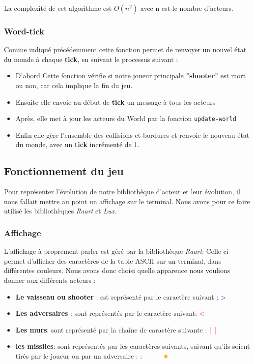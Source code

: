 \documentclass[a4paper,10pt]{article}
\begin{document}
La complexité de cet algorithme est $O(n^2)$ avec n est le nombre d'acteurs.
\subsubsection{Word-tick}
Comme indiqué précédemment cette fonction permet de  renvoyer un nouvel état du monde à chaque \textbf{tick}, en suivant le processus suivant : 
\begin{itemize}
    \item D'abord Cette fonction vérifie si notre joueur principale \textbf{"shooter"} est mort ou non, car cela implique la fin du jeu.
    \item Ensuite elle envoie au début de \textbf{tick} un message à tous les acteurs
    \item Après, elle met à jour les acteurs du World par la fonction \texttt{update-world}
    \item Enfin elle gère l'ensemble des collisions et bordures et renvoie le nouveau état du monde, avec un \textbf{tick} incrémenté de 1. 
\end{itemize}

\subsection{Fonctionnement du jeu}
\label{affichage}

Pour représenter l'évolution de notre bibliothèque d'acteur et leur évolution, il nous fallait mettre au point un affichage sur le terminal. Nous avons pour ce faire utilisé les bibliothèques \textit{Raart} et \textit{Lux}.
\subsubsection{Affichage}
\label{aff}
L'affichage à proprement parler est géré par la bibliothèque \textit{Raart}: Celle ci permet d'afficher des caractères de la table ASCII sur un terminal, dans différentes couleurs. Nous avons donc choisi quelle apparence nous voulions donner aux différents acteurs :\\ 
\begin{itemize}
    \item \textbf{Le vaisseau ou shooter} : est représenté par le caractère suivant : {\textcolor{Blue}{>}} \\
    \item \textbf{Les adversaires} : sont représentés par le caractère suivant: {\textcolor{Red}{<}} \\
    \item \textbf{Les murs}: sont représenté par la chaîne de caractère suivante : \textcolor{Red}{|\ |} \\
    \item \textbf{les missiles}: sont représentés par les caractères suivants, suivant qu'ils soient tirés par le joueur ou par un adversaire :  : \large{\textcolor{Orange}{\ -}} \ \ \ \small{\textcolor{Orange}{$\bigstar$}}  
\end{itemize}
\hfill
\newline
\end{document}
